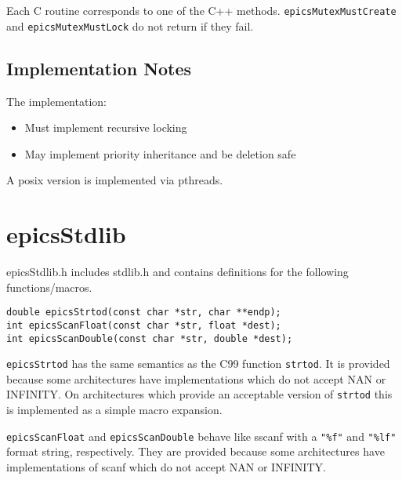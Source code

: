 Each C routine corresponds to one of the C++ methods. \verb|epicsMutexMustCreate| and \verb|epicsMutexMustLock| do 
not return if they fail.

\subsection{Implementation Notes}

The implementation:

\begin{itemize}
\item Must implement recursive locking

\item May implement priority inheritance and be deletion safe

\end{itemize}

A posix version is implemented via pthreads.

\section{epicsStdlib}

epicsStdlib.h includes stdlib.h and contains definitions for the following functions/macros.

\begin{verbatim}
double epicsStrtod(const char *str, char **endp);
int epicsScanFloat(const char *str, float *dest);
int epicsScanDouble(const char *str, double *dest);
\end{verbatim}

\verb|epicsStrtod| has the same semantics as the C99 function \verb|strtod|.  It is provided because some architectures have 
implementations which do not accept NAN or INFINITY.   On architectures which provide an acceptable version of 
\verb|strtod| this is implemented as a simple macro expansion.

\verb|epicsScanFloat| and \verb|epicsScanDouble| behave like sscanf with a \verb|"%f"| and \verb|"%lf"| format string, respectively.  
They are provided because some architectures have implementations of scanf which do not accept NAN or INFINITY.




